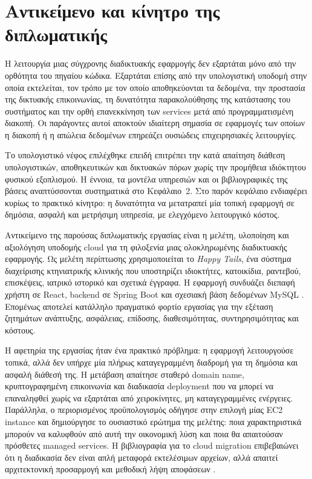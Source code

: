 \section{Αντικείμενο και κίνητρο της διπλωματικής}
Η λειτουργία μιας σύγχρονης διαδικτυακής εφαρμογής δεν εξαρτάται μόνο από
την ορθότητα του πηγαίου κώδικα. Εξαρτάται επίσης από την υπολογιστική
υποδομή στην οποία εκτελείται, τον τρόπο με τον οποίο αποθηκεύονται τα
δεδομένα, την προστασία της δικτυακής επικοινωνίας, τη δυνατότητα
παρακολούθησης της κατάστασης του συστήματος και την ορθή επανεκκίνηση των
services μετά από προγραμματισμένη διακοπή. Οι παράγοντες αυτοί αποκτούν ιδιαίτερη σημασία σε
εφαρμογές των οποίων η διακοπή ή η απώλεια δεδομένων επηρεάζει ουσιώδεις
επιχειρησιακές λειτουργίες.

Το υπολογιστικό νέφος επιλέχθηκε επειδή επιτρέπει την κατά απαίτηση διάθεση
υπολογιστικών, αποθηκευτικών και δικτυακών πόρων χωρίς την προμήθεια
ιδιόκτητου φυσικού εξοπλισμού. Η έννοια, τα μοντέλα υπηρεσιών και οι
βιβλιογραφικές της βάσεις αναπτύσσονται συστηματικά στο Κεφάλαιο~2. Στο
παρόν κεφάλαιο ενδιαφέρει κυρίως το πρακτικό κίνητρο: η δυνατότητα να
μετατραπεί μία τοπική εφαρμογή σε δημόσια, ασφαλή και μετρήσιμη υπηρεσία,
με ελεγχόμενο λειτουργικό κόστος.

Αντικείμενο της παρούσας διπλωματικής εργασίας είναι η μελέτη, υλοποίηση και
αξιολόγηση υποδομής cloud για τη φιλοξενία μιας ολοκληρωμένης διαδικτυακής
εφαρμογής. Ως μελέτη περίπτωσης χρησιμοποιείται το \emph{Happy Tails}, ένα
σύστημα διαχείρισης κτηνιατρικής κλινικής που υποστηρίζει ιδιοκτήτες,
κατοικίδια, ραντεβού, επισκέψεις, ιατρικό ιστορικό και σχετικά έγγραφα. Η
εφαρμογή συνδυάζει διεπαφή χρήστη σε React, backend σε Spring Boot και
σχεσιακή βάση δεδομένων MySQL \cite{react2026docs,spring2026boot,mysql2026manual}.
Επομένως αποτελεί κατάλληλο πραγματικό
φορτίο εργασίας για την εξέταση ζητημάτων ανάπτυξης, ασφάλειας, επίδοσης,
διαθεσιμότητας, συντηρησιμότητας και κόστους.

Η αφετηρία της εργασίας ήταν ένα πρακτικό πρόβλημα: η εφαρμογή λειτουργούσε
τοπικά, αλλά δεν υπήρχε μία πλήρως καταγεγραμμένη διαδρομή για τη δημόσια και
ασφαλή διάθεσή της. Η μετάβαση απαίτησε σταθερό domain name, κρυπτογραφημένη
επικοινωνία και διαδικασία deployment που να μπορεί να επαναληφθεί χωρίς να
εξαρτάται από χειροκίνητες, μη καταγεγραμμένες ενέργειες. Παράλληλα, ο
περιορισμένος προϋπολογισμός οδήγησε στην επιλογή μίας EC2 instance και
δημιούργησε το ουσιαστικό ερώτημα της μελέτης: ποια χαρακτηριστικά μπορούν να
καλυφθούν από αυτή την οικονομική λύση και ποια θα απαιτούσαν πρόσθετες
managed services. Η βιβλιογραφία για το cloud migration επιβεβαιώνει ότι η
διαδικασία δεν είναι απλή μεταφορά εκτελέσιμων αρχείων, αλλά απαιτεί
αρχιτεκτονική προσαρμογή και μεθοδική λήψη αποφάσεων
\cite{jamshidi2013migration}.

